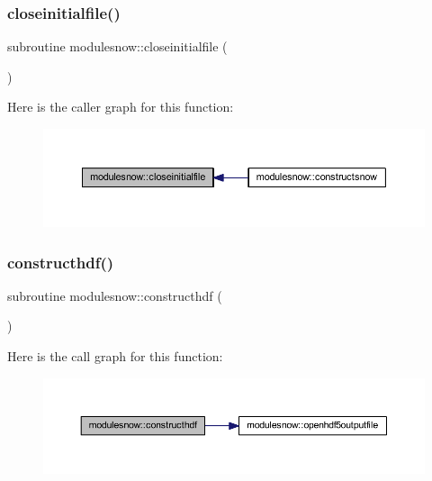 \subsubsection{\texorpdfstring{closeinitialfile()}{closeinitialfile()}}
{\footnotesize\ttfamily subroutine modulesnow\+::closeinitialfile (\begin{DoxyParamCaption}{ }\end{DoxyParamCaption})\hspace{0.3cm}{\ttfamily [private]}}

Here is the caller graph for this function\+:\nopagebreak
\begin{figure}[H]
\begin{center}
\leavevmode
\includegraphics[width=350pt]{namespacemodulesnow_aab9a2dba663d0f96350797dd7fbd0923_icgraph}
\end{center}
\end{figure}
\mbox{\label{namespacemodulesnow_a83ff8967e79c730436ab635d92f70eaf}} 
\subsubsection{\texorpdfstring{constructhdf()}{constructhdf()}}
{\footnotesize\ttfamily subroutine modulesnow\+::constructhdf (\begin{DoxyParamCaption}{ }\end{DoxyParamCaption})\hspace{0.3cm}{\ttfamily [private]}}

Here is the call graph for this function\+:\nopagebreak
\begin{figure}[H]
\begin{center}
\leavevmode
\includegraphics[width=350pt]{namespacemodulesnow_a83ff8967e79c730436ab635d92f70eaf_cgraph}
\end{center}
\end{figure}
\mbox{\label{namespacemodulesnow_a6d044212a6e9ba902389a391f8494f53}} 

